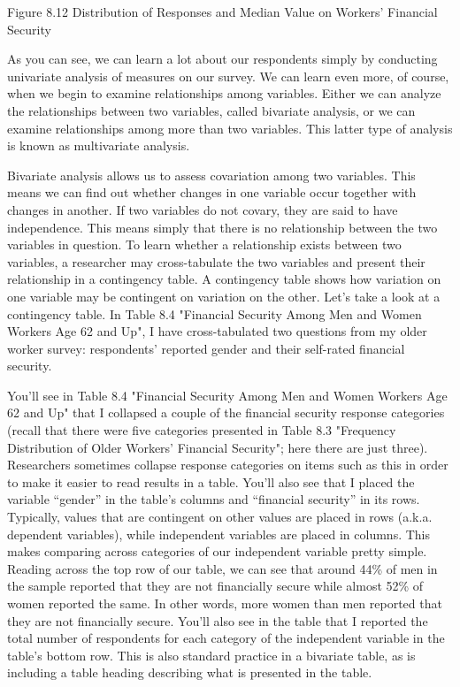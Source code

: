 Figure 8.12 Distribution of Responses and Median Value on Workers’ Financial Security

As you can see, we can learn a lot about our respondents simply by conducting univariate analysis of measures on our survey. We can learn even more, of course, when we begin to examine relationships among variables. Either we can analyze the relationships between two variables, called bivariate analysis, or we can examine relationships among more than two variables. This latter type of analysis is known as multivariate analysis.

Bivariate analysis allows us to assess covariation among two variables. This means we can find out whether changes in one variable occur together with changes in another. If two variables do not covary, they are said to have independence. This means simply that there is no relationship between the two variables in question. To learn whether a relationship exists between two variables, a researcher may cross-tabulate the two variables and present their relationship in a contingency table. A contingency table shows how variation on one variable may be contingent on variation on the other. Let’s take a look at a contingency table. In Table 8.4 "Financial Security Among Men and Women Workers Age 62 and Up", I have cross-tabulated two questions from my older worker survey: respondents’ reported gender and their self-rated financial security.

You’ll see in Table 8.4 "Financial Security Among Men and Women Workers Age 62 and Up" that I collapsed a couple of the financial security response categories (recall that there were five categories presented in Table 8.3 "Frequency Distribution of Older Workers’ Financial Security"; here there are just three). Researchers sometimes collapse response categories on items such as this in order to make it easier to read results in a table. You’ll also see that I placed the variable “gender” in the table’s columns and “financial security” in its rows. Typically, values that are contingent on other values are placed in rows (a.k.a. dependent variables), while independent variables are placed in columns. This makes comparing across categories of our independent variable pretty simple. Reading across the top row of our table, we can see that around 44\% of men in the sample reported that they are not financially secure while almost 52\% of women reported the same. In other words, more women than men reported that they are not financially secure. You’ll also see in the table that I reported the total number of respondents for each category of the independent variable in the table’s bottom row. This is also standard practice in a bivariate table, as is including a table heading describing what is presented in the table.

